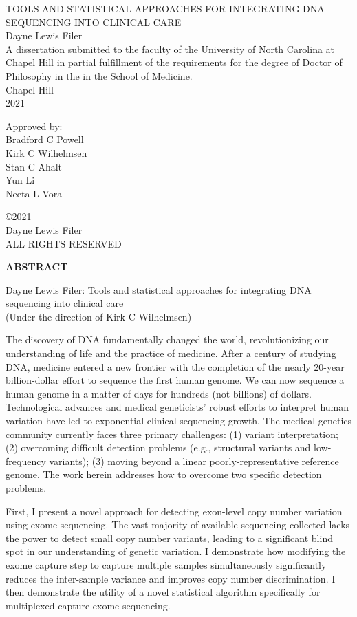 \documentclass[11pt,letterpaper,oneside]{book}
\renewcommand{\maketitle}{ 
	\singlespacing
	\thispagestyle{empty} 
	\begin{center}
	  \vspace*{0.8125in}
	  {\MakeUppercase{Tools and statistical approaches for integrating DNA sequencing into clinical care}} \\ \vspace{1in} 
	  \normalsize 
  	Dayne Lewis Filer \\ \vspace{1in} 
  	A dissertation submitted to the faculty of the University of North Carolina at Chapel Hill in partial fulfillment of the requirements for the degree of Doctor of Philosophy in the  in the School of Medicine.
  	\vspace{1in}
  	\\ Chapel Hill \\ 2021 \\ 
	\end{center}
	\vspace{1in}
	\hfill
  \begin{minipage}{1.5in} 
      \raggedright
      \doublespacing
      Approved by:\\
              Bradford C Powell \\
              Kirk C Wilhelmsen \\
              Stan C Ahalt \\
              Yun Li \\
              Neeta L Vora \\
        \end{minipage}
}
\newcommand{\mytwoin}[1]{
\vspace*{0.6875in}
\begin{center}
\bfseries\MakeUppercase{#1}
\end{center}
}
\begin{document}
\frontmatter

  \maketitle

\pagestyle{plain}
\doublespacing

  \clearpage
  \vspace*{\fill}
  \begin{center}
    \singlespacing
    \copyright 2021 \\
    Dayne Lewis Filer \\
    ALL RIGHTS RESERVED
  \end{center}
  \vspace{1in}

  \clearpage
  \mytwoin{abstract}
  \begin{center}
    \singlespacing
    Dayne Lewis Filer: Tools and statistical approaches for integrating DNA sequencing into clinical care \\ (Under the direction of Kirk C Wilhelmsen)
  \end{center}
  
  \doublespacing
  The discovery of DNA fundamentally changed the world, revolutionizing our understanding of life and the practice of medicine.
  After a century of studying DNA, medicine entered a new frontier with the completion of the nearly 20-year billion-dollar effort to sequence the first human genome.
  We can now sequence a human genome in a matter of days for hundreds (not billions) of dollars.
  Technological advances and medical geneticists' robust efforts to interpret human variation have led to exponential clinical sequencing growth.
  The medical genetics community currently faces three primary challenges: (1) variant interpretation; (2) overcoming difficult detection problems (e.g., structural variants and low-frequency variants); (3) moving beyond a linear poorly-representative reference genome.
  The work herein addresses how to overcome two specific detection problems.

  First, I present a novel approach for detecting exon-level copy number variation using exome sequencing.
  The vast majority of available sequencing collected lacks the power to detect small copy number variants, leading to a significant blind spot in our understanding of genetic variation.
  I demonstrate how modifying the exome capture step to capture multiple samples simultaneously significantly reduces the inter-sample variance and improves copy number discrimination.
  I then demonstrate the utility of a novel statistical algorithm specifically for multiplexed-capture exome sequencing.
\end{document}
